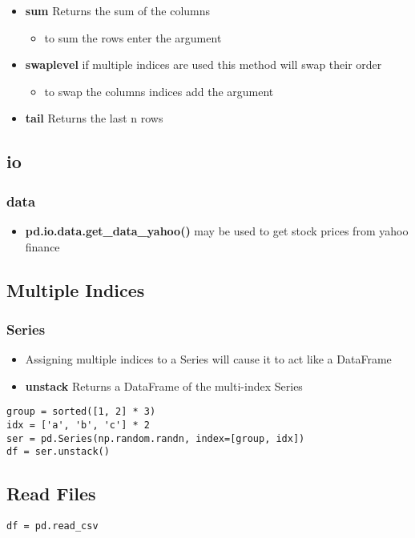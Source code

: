 \begin{itemize}
  \item \textbf{sum} Returns the sum of the columns
    \begin{itemize}
      \item to sum the rows enter the argument \color{red}{axis=1}
    \end{itemize}
  \item \textbf{swaplevel} if multiple indices are used this method will swap
    their order
    \begin{itemize}
      \item to swap the columns indices add the argument {\color{red}{axis=1}}
    \end{itemize}
  \item \textbf{tail} Returns the last n rows
\end{itemize}

\subsection{io}
\subsubsection{data}
\begin{itemize}
  \item \textbf{pd.io.data.get\_data\_yahoo()} may be used to get stock prices
    from yahoo finance
\end{itemize}

\subsection{Multiple Indices}
\subsubsection{Series}
\begin{itemize}
  \item Assigning multiple indices to a Series will cause it to act like a
    DataFrame
  \item \textbf{unstack} Returns a DataFrame of the multi-index Series
\end{itemize}
\begin{lstlisting}
group = sorted([1, 2] * 3)
idx = ['a', 'b', 'c'] * 2
ser = pd.Series(np.random.randn, index=[group, idx])
df = ser.unstack()
\end{lstlisting}

\subsection{Read Files}
\begin{lstlisting}
df = pd.read_csv
\end{lstlisting}

